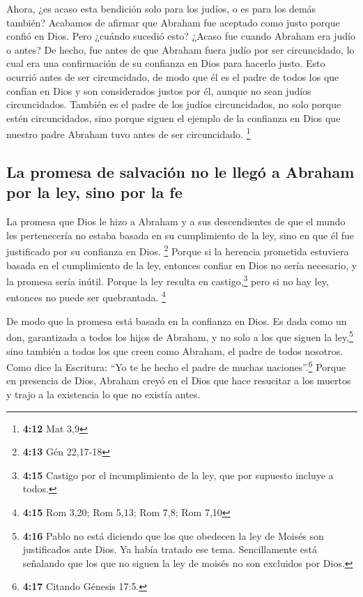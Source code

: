  Ahora, ¿es acaso esta bendición solo para los judíos, o
es para los demás también? Acabamos de afirmar que Abraham fue aceptado
como justo porque confió en Dios.  Pero ¿cuándo sucedió
esto? ¿Acaso fue cuando Abraham era judío o antes?  De
hecho, fue antes de que Abraham fuera judío por ser circuncidado, lo
cual era una confirmación de su confianza en Dios para hacerlo justo.
Esto ocurrió antes de ser circuncidado, de modo que él es el padre de
todos los que confían en Dios y son considerados justos por él, aunque
no sean judíos circuncidados.  También es el padre de los
judíos circuncidados, no solo porque estén circuncidados, sino porque
siguen el ejemplo de la confianza en Dios que nuestro padre Abraham tuvo
antes de ser circuncidado. \footnote{\textbf{4:12} Mat 3,9}

\hypertarget{la-promesa-de-salvaciuxf3n-no-le-lleguxf3-a-abraham-por-la-ley-sino-por-la-fe}{%
\subsection{La promesa de salvación no le llegó a Abraham por la ley,
sino por la
fe}\label{la-promesa-de-salvaciuxf3n-no-le-lleguxf3-a-abraham-por-la-ley-sino-por-la-fe}}

 La promesa que Dios le hizo a Abraham y a sus
descendientes de que el mundo les pertenecería no estaba basada en su
cumplimiento de la ley, sino en que él fue justificado por su confianza
en Dios. \footnote{\textbf{4:13} Gén 22,17-18}  Porque si
la herencia prometida estuviera basada en el cumplimiento de la ley,
entonces confiar en Dios no sería necesario, y la promesa sería inútil.
 Porque la ley resulta en castigo,\footnote{\textbf{4:15}
  Castigo por el incumplimiento de la ley, que por supuesto incluye a
  todos.} pero si no hay ley, entonces no puede ser quebrantada.
\footnote{\textbf{4:15} Rom 3,20; Rom 5,13; Rom 7,8; Rom 7,10}

 De modo que la promesa está basada en la confianza en
Dios. Es dada como un don, garantizada a todos los hijos de Abraham, y
no solo a los que siguen la ley,\footnote{\textbf{4:16} Pablo no está
  diciendo que los que obedecen la ley de Moisés son justificados ante
  Dios. Ya había tratado ese tema. Sencillamente está señalando que los
  que no siguen la ley de moisés no son excluidos por Dios.} sino
también a todos los que creen como Abraham, el padre de todos nosotros.
 Como dice la Escritura: ``Yo te he hecho el padre de
muchas naciones''.\footnote{\textbf{4:17} Citando Génesis 17:5.} Porque
en presencia de Dios, Abraham creyó en el Dios que hace resucitar a los
muertos y trajo a la existencia lo que no existía antes.


